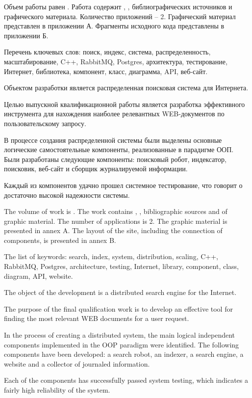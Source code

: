 
Объем работы равен . Работа содержит , ,  библиографических источников и  графического материала. Количество приложений – 2. Графический материал представлен в приложении А. Фрагменты исходного кода представлены в приложении Б.

Перечень ключевых слов: поиск, индекс, система, распределенность, масштабирование, C++, RabbitMQ, Postgres, архитектура, тестирование, Интернет, библиотека, компонент, класс, диаграмма, API, веб-сайт.

Объектом разработки является распределенная поисковая система для Интернета.

Целью выпускной квалификационной работы является разработка эффективного инструмента для нахождения наиболее релевантных WEB-документов по пользовательскому запросу.

В процессе создания распределенной системы были выделены основные логические самостоятельные компоненты, реализованные в парадигме ООП. Были разработаны следующие компоненты: поисковый робот, индексатор, поисковик, веб-сайт и сборщик журналируемой информации.

Каждый из компонентов удачно прошел системное тестирование, что говорит о достаточно высокой надежности системы.

  
The volume of work is . The work contains , ,  bibliographic sources and  of graphic material. The number of applications is 2. The graphic material is presented in annex A. The layout of the site, including the connection of components, is presented in annex B.

The list of keywords: search, index, system, distribution, scaling, C++, RabbitMQ, Postgres, architecture, testing, Internet, library, component, class, diagram, API, website.

The object of the development is a distributed search engine for the Internet.

The purpose of the final qualification work is to develop an effective tool for finding the most relevant WEB documents for a user request.

In the process of creating a distributed system, the main logical independent components implemented in the OOP paradigm were identified. The following components have been developed: a search robot, an indexer, a search engine, a website and a collector of journaled information.

Each of the components has successfully passed system testing, which indicates a fairly high reliability of the system.
